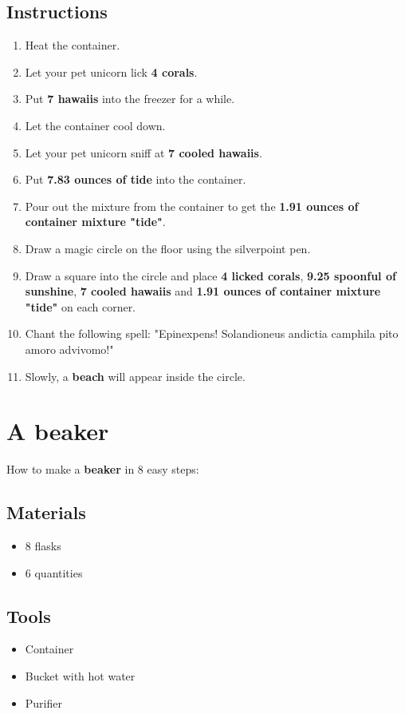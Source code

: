 \documentclass{article}
\begin{document}
\subsection{Instructions}\begin{enumerate}
\item 
Heat the container.
\item 
Let your pet unicorn lick \textbf{4 corals}.
\item 
Put \textbf{7 hawaiis} into the freezer for a while.
\item 
Let the container cool down.
\item 
Let your pet unicorn sniff at \textbf{7 cooled hawaiis}.
\item 
Put \textbf{7.83 ounces of tide} into the container.
\item 
Pour out the mixture from the container to get the \textbf{1.91 ounces of container mixture "tide"}.
\item 
Draw a magic circle on the floor using the silverpoint pen.
\item 
Draw a square into the circle and place \textbf{4 licked corals}, \textbf{9.25 spoonful of sunshine}, \textbf{7 cooled hawaiis} and \textbf{1.91 ounces of container mixture "tide"} on each corner.
\item 
Chant the following spell: "Epinexpens! Solandioneus andictia camphila pito amoro advivomo!"
\item 
Slowly, a \textbf{beach} will appear inside the circle.
\end{enumerate}
\newpage
\section{A beaker}How to make a \textbf{beaker} in 8 easy steps:

\subsection{Materials}\begin{itemize}
\item 
8 flasks
\item 
6 quantities
\end{itemize}
\subsection{Tools}\begin{itemize}
\item 
Container
\item 
Bucket with hot water
\item 
Purifier
\end{itemize}
\end{document}

